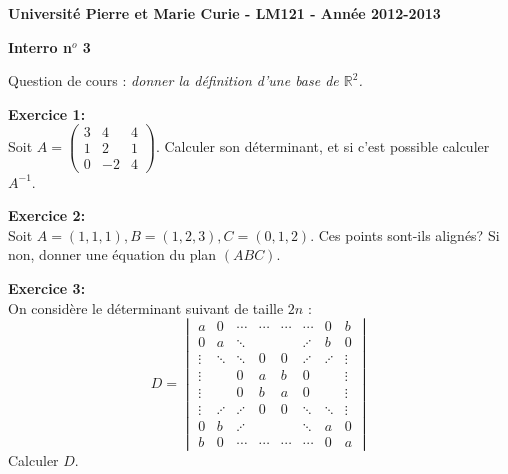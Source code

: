 \documentclass[a4paper, 10pt]{article}
\theoremstyle{plain}
\newcommand{\R}{\mathbb{R}}
\begin{document}
\noindent
\large
\textbf{Universit\'e Pierre et Marie Curie 
 - LM121 -
Ann\'ee 2012-2013}\\

\begin{center}
\Large
\textbf{Interro n$^o$ 3}
\end{center}
\normalsize

\medskip
\noindent
Question de cours : \emph{donner la définition d'une base de $\R^2$.}

\bigskip
\noindent
\textbf{Exercice 1:}\\
Soit $A =\begin{pmatrix}
          3&4&4 \\
         1&2&1 \\
         0&-2&4
         \end{pmatrix}$.
Calculer son déterminant, et si c'est possible calculer $A^{-1}$.

\bigskip
\noindent
\textbf{Exercice 2:}\\
Soit $A=(1,1,1) , B= (1,2,3) , C=(0,1,2)$. Ces points sont-ils alignés? Si non, donner 
une équation du plan $(ABC)$.

\medskip
\noindent
\textbf{Exercice 3:}\\
On considère le déterminant suivant de taille $2n$ : 
\[D = 
\begin{vmatrix}
a & 0 & \cdots & \cdots & \cdots & \cdots &0 & b \\
0 & a & \ddots  &       &      &\iddots & b & 0 \\
\vdots & \ddots & \ddots & 0  & 0 &\iddots & \iddots  & \vdots \\
\vdots &  & 0 & a & b & 0 & &\vdots \\
\vdots & & 0 & b & a & 0 & & \vdots \\
\vdots & \iddots  & \iddots & 0 & 0 & \ddots & \ddots & \vdots \\
0 & b & \iddots & & & \ddots & a & 0 \\
b &0 & \cdots & \cdots & \cdots & \cdots & 0 & a
\end{vmatrix}
\] 
Calculer $D$. 
\end{document}
